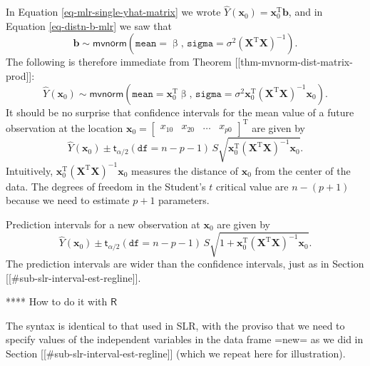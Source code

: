 In Equation \eqref{eq-mlr-single-yhat-matrix} we wrote \(
\hat{Y}(\mathbf{x}_{0})=\mathbf{x}_{0}^{\mathrm{T}}\mathbf{b} \), and
in Equation \eqref{eq-distn-b-mlr} we saw that
\begin{equation}
\mathbf{b}\sim\mathsf{mvnorm}\left(\mathtt{mean} = \upbeta,\,\mathtt{sigma}=\sigma^{2}\left(\mathbf{X}^{\mathrm{T}}\mathbf{X}\right)^{-1}\right).
\end{equation}
The following is therefore immediate from Theorem
[[thm-mvnorm-dist-matrix-prod]]:
\begin{equation}
\hat{Y}(\mathbf{x}_{0})\sim\mathsf{mvnorm}\left(\mathtt{mean}=\mathbf{x}_{0}^{\mathrm{T}}\upbeta,\,\mathtt{sigma}=\sigma^{2}\mathbf{x}_{0}^{\mathrm{T}}\left(\mathbf{X}^{\mathrm{T}}\mathbf{X}\right)^{-1}\mathbf{x}_{0}\right).
\end{equation}
It should be no surprise that confidence intervals for the mean value
of a future observation at the location
\(\mathbf{x}_{0}=\begin{bmatrix}x_{10} & x_{20} & \ldots &
x_{p0}\end{bmatrix}^{\mathrm{T}}\) are given by
\begin{equation}
\hat{Y}(\mathbf{x}_{0})\pm\mathsf{t}_{\alpha/2}(\mathtt{df}=n-p-1)\, S\sqrt{\mathbf{x}_{0}^{\mathrm{T}}\left(\mathbf{X}^{\mathrm{T}}\mathbf{X}\right)^{-1}\mathbf{x}_{0}}.
\end{equation}
Intuitively,
\(\mathbf{x}_{0}^{\mathrm{T}}\left(\mathbf{X}^{\mathrm{T}}\mathbf{X}\right)^{-1}\mathbf{x}_{0}\)
measures the distance of \(\mathbf{x}_{0}\) from the center of the
data. The degrees of freedom in the Student's \(t\) critical value are
\(n-(p+1)\) because we need to estimate \(p+1\) parameters.

Prediction intervals for a new observation at \(\mathbf{x}_{0}\) are
given by
\begin{equation}
\hat{Y}(\mathbf{x}_{0})\pm\mathsf{t}_{\alpha/2}(\mathtt{df}=n-p-1)\, S\sqrt{1+\mathbf{x}_{0}^{\mathrm{T}}\left(\mathbf{X}^{\mathrm{T}}\mathbf{X}\right)^{-1}\mathbf{x}_{0}}.
\end{equation}
The prediction intervals are wider than the confidence intervals, just as in Section [[#sub-slr-interval-est-regline]].

**** How to do it with \(\mathsf{R}\)

The syntax is identical to that used in SLR, with the proviso that we
need to specify values of the independent variables in the data frame
=new= as we did in Section [[#sub-slr-interval-est-regline]] (which we
repeat here for illustration).

